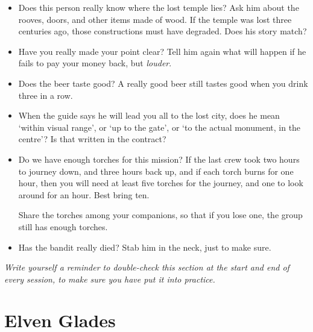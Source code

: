\begin{multicols}{2}
\begin{itemize}
  \item
  Does this person really know where the lost temple lies?
  Ask him about the rooves, doors, and other items made of wood.
  If the temple was lost three centuries ago, those constructions must have degraded.
  Does his story match?
  \item
  Have you really made your point clear?
  Tell him again what will happen if he fails to pay your money back, but \emph{louder}.
  \item
  Does the beer taste good?
  A really good beer still tastes good when you drink three in a row.
  \item
  When the guide says he will lead you all to the lost city, does he mean `within visual range', or `up to the gate', or `to the actual monument, in the centre'?
  Is that written in the contract?
  \item
  Do we have enough torches for this mission?
  If the last crew took two hours to journey down, and three hours back up, and if each torch burns for one hour, then you will need at least five torches for the journey, and one to look around for an hour.
  Best bring ten.

  Share the torches among your companions, so that if you lose one, the group still has enough torches.
  \item
  Has the bandit really died?
  Stab him in the neck, just to make sure.
\end{itemize}

\emph{Write yourself a reminder to double-check this section at the start and end of every session, to make sure you have put it into practice.}

\end{multicols}

\section[Elves]{Elven Glades \El}
\label{elvenGlades}


